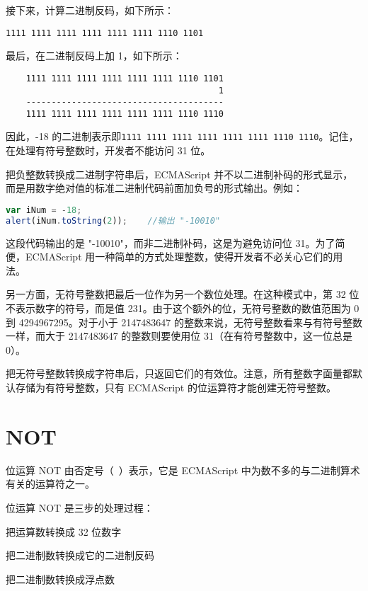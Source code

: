 接下来，计算二进制反码，如下所示：

\verb|1111 1111 1111 1111 1111 1111 1110 1101|

最后，在二进制反码上加 1，如下所示：

\begin{verbatim}
    1111 1111 1111 1111 1111 1111 1110 1101
                                          1
    ---------------------------------------
    1111 1111 1111 1111 1111 1111 1110 1110
\end{verbatim}

因此，-18 的二进制表示即\verb|1111 1111 1111 1111 1111 1111 1110 1110|。记住，在处理有符号整数时，开发者不能访问 31 位。

把负整数转换成二进制字符串后，ECMAScript 并不以二进制补码的形式显示，而是用数字绝对值的标准二进制代码前面加负号的形式输出。例如：

\begin{lstlisting}[language=JavaScript]
var iNum = -18;
alert(iNum.toString(2));	//输出 "-10010"
\end{lstlisting}

这段代码输出的是 "-10010"，而非二进制补码，这是为避免访问位 31。为了简便，ECMAScript 用一种简单的方式处理整数，使得开发者不必关心它们的用法。

另一方面，无符号整数把最后一位作为另一个数位处理。在这种模式中，第 32 位不表示数字的符号，而是值 231。由于这个额外的位，无符号整数的数值范围为 0 到 4294967295。对于小于 2147483647 的整数来说，无符号整数看来与有符号整数一样，而大于 2147483647 的整数则要使用位 31（在有符号整数中，这一位总是 0）。

把无符号整数转换成字符串后，只返回它们的有效位。注意，所有整数字面量都默认存储为有符号整数，只有 ECMAScript 的位运算符才能创建无符号整数。

\section{NOT}

位运算 NOT 由否定号（~）表示，它是 ECMAScript 中为数不多的与二进制算术有关的运算符之一。

位运算 NOT 是三步的处理过程：

\begin{compactenum}
\item 把运算数转换成 32 位数字
\item 把二进制数转换成它的二进制反码
\item 把二进制数转换成浮点数
\end{compactenum}



